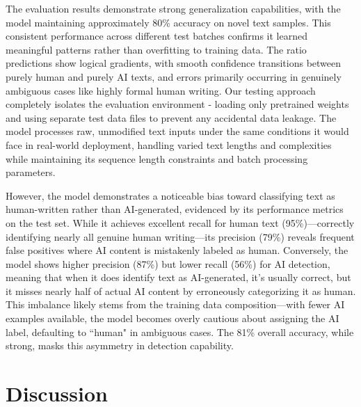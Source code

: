 \documentclass{article} %
\begin{document}
The evaluation results demonstrate strong generalization capabilities, with the model maintaining approximately 80\% accuracy on novel text samples. This consistent performance across different test batches confirms it learned meaningful patterns rather than overfitting to training data. The ratio predictions show logical gradients, with smooth confidence transitions between purely human and purely AI texts, and errors primarily occurring in genuinely ambiguous cases like highly formal human writing. Our testing approach completely isolates the evaluation environment - loading only pretrained weights and using separate test data files to prevent any accidental data leakage. The model processes raw, unmodified text inputs under the same conditions it would face in real-world deployment, handling varied text lengths and complexities while maintaining its sequence length constraints and batch processing parameters.

However, the model demonstrates a noticeable bias toward classifying text as human-written rather than AI-generated, evidenced by its performance metrics on the test set. While it achieves excellent recall for human text (95\%)—correctly identifying nearly all genuine human writing—its precision (79\%) reveals frequent false positives where AI content is mistakenly labeled as human. Conversely, the model shows higher precision (87\%) but lower recall (56\%) for AI detection, meaning that when it does identify text as AI-generated, it’s usually correct, but it misses nearly half of actual AI content by erroneously categorizing it as human. This imbalance likely stems from the training data composition—with fewer AI examples available, the model becomes overly cautious about assigning the AI label, defaulting to ``human" in ambiguous cases. The 81\% overall accuracy, while strong, masks this asymmetry in detection capability.

\section{Discussion}
\end{document}
